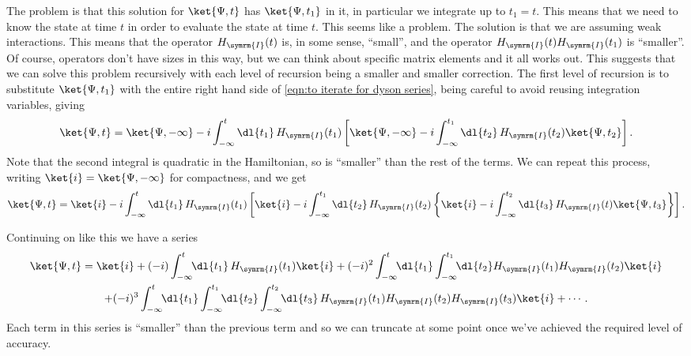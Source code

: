 \documentclass[fleqn]{NotesClass}
\newcommand{\interaction}{\symrm{I}}
\begin{document}
    The problem is that this solution for \(\ket{\Psi, t}\) has \(\ket{\Psi, t_1}\) in it, in particular we integrate up to \(t_1 = t\).
    This means that we need to know the state at time \(t\) in order to evaluate the state at time \(t\).
    This seems like a problem.
    The solution is that we are assuming weak interactions.
    This means that the operator \(H_{\interaction}(t)\) is, in some sense, \enquote{small}, and the operator \(H_{\interaction}(t)H_{\interaction}(t_1)\) is \enquote{smaller}.
    Of course, operators don't have sizes in this way, but we can think about specific matrix elements and it all works out.
    This suggests that we can solve this problem recursively with each level of recursion being a smaller and smaller correction.
    The first level of recursion is to substitute \(\ket{\Psi, t_1}\) with the entire right hand side of \cref{eqn:to iterate for dyson series}, being careful to avoid reusing integration variables, giving
    \begin{equation}
        \ket{\Psi, t} = \ket{\Psi, -\infty} - i \int_{-\infty}^{t} \dl{t_1} \, H_{\interaction}(t_1) \left[ \ket{\Psi, -\infty} - i\int_{-\infty}^{t_1} \dl{t_2} \, H_{\interaction}(t_2) \ket{\Psi, t_2} \right].
    \end{equation}
    Note that the second integral is quadratic in the Hamiltonian, so is \enquote{smaller} than the rest of the terms.
    We can repeat this process, writing \(\ket{i} = \ket{\Psi, -\infty}\) for compactness, and we get
    \begin{equation*}
        \ket{\Psi, t} = \ket{i} - i \int_{-\infty}^{t} \dl{t_1} \, H_{\interaction}(t_1) \left[ \ket{i} - i \int_{-\infty}^{t_1} \dl{t_2} \, H_{\interaction}(t_2) \left\{ \ket{i} - i \int_{-\infty}^{t_2} \dl{t_3} \, H_{\interaction}(t) \ket{\Psi, t_3} \right\} \right].
    \end{equation*}
    
    Continuing on like this we have a series
    \begin{multline}
        \ket{\Psi, t} = \ket{i} + (-i) \int_{-\infty}^{t} \!\! \dl{t_1} \, H_{\interaction}(t_1) \ket{i} + (-i)^2 \int_{-\infty}^{t} \!\! \dl{t_1} \int_{-\infty}^{t_1} \!\! \dl{t_2} H_{\interaction}(t_1) H_{\interaction}(t_2) \ket{i}\\
        + (-i)^3 \int_{-\infty}^{t} \!\! \dl{t_1} \int_{-\infty}^{t_1} \!\! \dl{t_2} \int_{-\infty}^{t_2} \!\! \dl{t_3} \, H_{\interaction}(t_1) H_{\interaction}(t_2) H_{\interaction}(t_3) \ket{i} + \dotsb.
    \end{multline}
    Each term in this series is \enquote{smaller} than the previous term and so we can truncate at some point once we've achieved the required level of accuracy.
    
\end{document}
